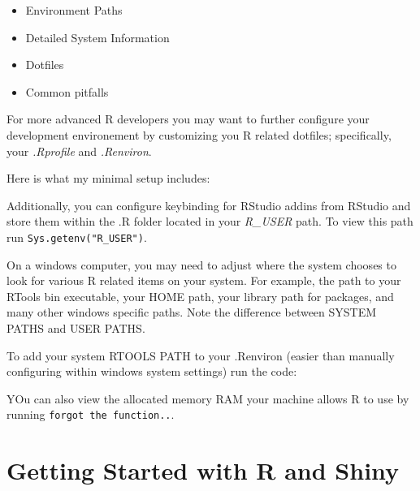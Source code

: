 \documentclass[
]{book}
\newenvironment{Shaded}{\begin{snugshade}}{\end{snugshade}}
\newcommand{\CharTok}[1]{\textcolor[rgb]{0.31,0.60,0.02}{#1}}
\newcommand{\DataTypeTok}[1]{\textcolor[rgb]{0.13,0.29,0.53}{#1}}
\newcommand{\KeywordTok}[1]{\textcolor[rgb]{0.13,0.29,0.53}{\textbf{#1}}}
\newcommand{\NormalTok}[1]{#1}
\newcommand{\OperatorTok}[1]{\textcolor[rgb]{0.81,0.36,0.00}{\textbf{#1}}}
\newcommand{\OtherTok}[1]{\textcolor[rgb]{0.56,0.35,0.01}{#1}}
\newcommand{\StringTok}[1]{\textcolor[rgb]{0.31,0.60,0.02}{#1}}
\providecommand{\tightlist}{%
  \setlength{\itemsep}{0pt}\setlength{\parskip}{0pt}}
\begin{document}
\begin{itemize}
\tightlist
\item
  Environment Paths
\item
  Detailed System Information
\item
  Dotfiles
\item
  Common pitfalls
\end{itemize}

For more advanced R developers you may want to further configure your development
environement by customizing you R related dotfiles;
specifically, your \emph{.Rprofile} and \emph{.Renviron}.

Here is what my minimal setup includes:

Additionally, you can configure keybinding for RStudio addins from RStudio and
store them within the .R folder located in your \emph{R\_USER} path. To view
this path run \texttt{Sys.getenv("R\_USER")}.

On a windows computer, you may need to adjust where the system chooses to look
for various R related items on your system. For example, the path to your RTools
bin executable, your HOME path, your library path for packages,
and many other windows specific paths. Note the difference between
SYSTEM PATHS and USER PATHS.

To add your system RTOOLS PATH to your .Renviron
(easier than manually configuring within windows system settings) run the code:

\begin{Shaded}
\end{Shaded}

YOu can also view the allocated memory RAM your machine allows R to use by
running \texttt{forgot\ the\ function..}.

\hypertarget{getting-started-with-r-and-shiny}{%
\chapter{Getting Started with R and Shiny}\label{getting-started-with-r-and-shiny}}
\end{document}
